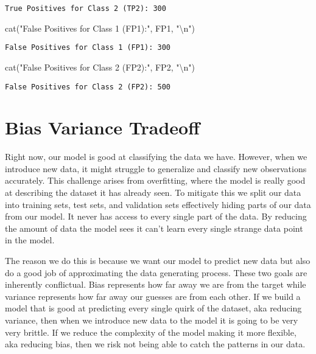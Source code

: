 \documentclass[
  letterpaper,
  DIV=11,
  numbers=noendperiod]{scrreprt}
\newenvironment{Shaded}{\begin{snugshade}}{\end{snugshade}}
\newcommand{\FunctionTok}[1]{\textcolor[rgb]{0.28,0.35,0.67}{#1}}
\newcommand{\NormalTok}[1]{\textcolor[rgb]{0.00,0.23,0.31}{#1}}
\newcommand{\SpecialCharTok}[1]{\textcolor[rgb]{0.37,0.37,0.37}{#1}}
\newcommand{\StringTok}[1]{\textcolor[rgb]{0.13,0.47,0.30}{#1}}
\begin{document}
\begin{verbatim}
True Positives for Class 2 (TP2): 300 
\end{verbatim}

\begin{Shaded}
\begin{Highlighting}[]
\FunctionTok{cat}\NormalTok{(}\StringTok{"False Positives for Class 1 (FP1):"}\NormalTok{, FP1, }\StringTok{"}\SpecialCharTok{\textbackslash{}n}\StringTok{"}\NormalTok{)}
\end{Highlighting}
\end{Shaded}

\begin{verbatim}
False Positives for Class 1 (FP1): 300 
\end{verbatim}

\begin{Shaded}
\begin{Highlighting}[]
\FunctionTok{cat}\NormalTok{(}\StringTok{"False Positives for Class 2 (FP2):"}\NormalTok{, FP2, }\StringTok{"}\SpecialCharTok{\textbackslash{}n}\StringTok{"}\NormalTok{)}
\end{Highlighting}
\end{Shaded}

\begin{verbatim}
False Positives for Class 2 (FP2): 500 
\end{verbatim}

\section{Bias Variance Tradeoff}\label{bias-variance-tradeoff}

Right now, our model is good at classifying the data we have. However,
when we introduce new data, it might struggle to generalize and classify
new observations accurately. This challenge arises from overfitting,
where the model is really good at describing the dataset it has already
seen. To mitigate this we split our data into training sets, test sets,
and validation sets effectively hiding parts of our data from our model.
It never has access to every single part of the data. By reducing the
amount of data the model sees it can't learn every single strange data
point in the model.

The reason we do this is because we want our model to predict new data
but also do a good job of approximating the data generating process.
These two goals are inherently conflictual. Bias represents how far away
we are from the target while variance represents how far away our
guesses are from each other. If we build a model that is good at
predicting every single quirk of the dataset, aka reducing variance,
then when we introduce new data to the model it is going to be very very
brittle. If we reduce the complexity of the model making it more
flexible, aka reducing bias, then we risk not being able to catch the
patterns in our data.
\end{document}
